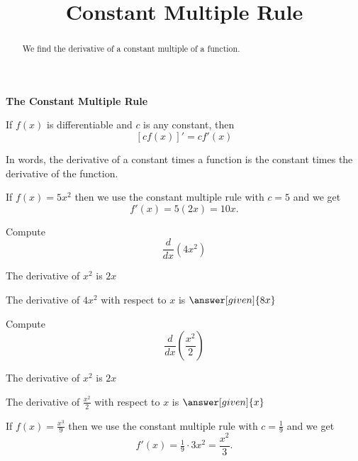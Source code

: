 \documentclass{ximera}
\title{Constant Multiple Rule}
\begin{document}
\begin{abstract}
We find the derivative of a constant multiple of a 
function.
\end{abstract}



\maketitle


\begin{center}
\bf{The Constant Multiple Rule}
\end{center}


\begin{theorem} If $f(x)$ is differentiable and $c$ is any constant, then
\[[cf(x)]' = c f'(x)\]
\end{theorem}

In words, the derivative of a constant times a function is the constant times the derivative of the function.\\



\begin{example} %
 If $f(x) = 5x^2$ then  we use the constant multiple rule with $c = 5$ and we get 
\[
f'(x) = 5(2x)  = 10x.
\]
\end{example}


\begin{problem} %
  Compute 
  \[
  \frac{d}{dx} \left(4x^2\right)
  \]
  
    \begin{hint}
      The derivative of $x^2$ is $2x$
    \end{hint}    
		The derivative of $4x^2$ with respect to $x$ is
		 $\answer[given]{8x}$
	
\end{problem}


\begin{problem} %
  Compute 
  \[
  \frac{d}{dx} \left(\frac{x^2}{2}\right)
  \]
  
    \begin{hint}
      The derivative of $x^2$ is $2x$
    \end{hint}    
		The derivative of $\frac{x^2}{2}$ with respect to $x$ is
		 $\answer[given]{x}$
	
\end{problem}


\begin{example} %
 If $f(x) = \frac{x^3}{9}$ then  we use the constant multiple rule with $c = \frac19$ and we get 
\[
f'(x) = \tfrac19 \cdot 3x^2 
= \frac{x^2}{3}.
\]
\end{example}
\end{document}
